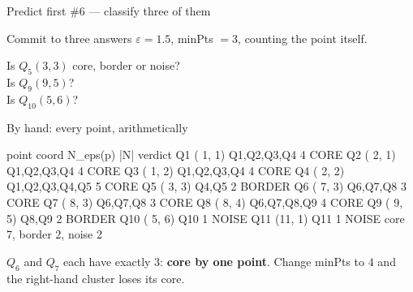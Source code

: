 \documentclass[aspectratio=169]{beamer}
\begin{document}
\begin{frame}[shrink=8]{Predict first \#6 --- classify three of them}
  \begin{alertblock}{Commit to three answers}
    $\varepsilon = 1.5$, minPts $= 3$, counting the point itself.

    \medskip
    \centering\large
    Is $Q_5(3,3)$ core, border or noise? \\
    Is $Q_9(9,5)$? \\
    Is $Q_{10}(5,6)$?
  \end{alertblock}
\end{frame}

\begin{frame}[fragile,shrink=8]{By hand: every point, arithmetically}
\begin{outblk}
  point   coord     N_eps(p)                       |N|  verdict
  Q1     ( 1, 1)  {Q1,Q2,Q3,Q4                 }   4  CORE
  Q2     ( 2, 1)  {Q1,Q2,Q3,Q4                 }   4  CORE
  Q3     ( 1, 2)  {Q1,Q2,Q3,Q4                 }   4  CORE
  Q4     ( 2, 2)  {Q1,Q2,Q3,Q4,Q5              }   5  CORE
  Q5     ( 3, 3)  {Q4,Q5                       }   2  BORDER
  Q6     ( 7, 3)  {Q6,Q7,Q8                    }   3  CORE
  Q7     ( 8, 3)  {Q6,Q7,Q8                    }   3  CORE
  Q8     ( 8, 4)  {Q6,Q7,Q8,Q9                 }   4  CORE
  Q9     ( 9, 5)  {Q8,Q9                       }   2  BORDER
  Q10    ( 5, 6)  {Q10                         }   1  NOISE
  Q11    (11, 1)  {Q11                         }   1  NOISE
  core 7, border 2, noise 2
\end{outblk}
  \vspace{0.1em}
  \begin{center}\small
    $Q_6$ and $Q_7$ each have exactly $3$: \textbf{core by one point}. Change
    minPts to $4$ and the right-hand cluster loses its core.
  \end{center}
\end{frame}
\end{document}
